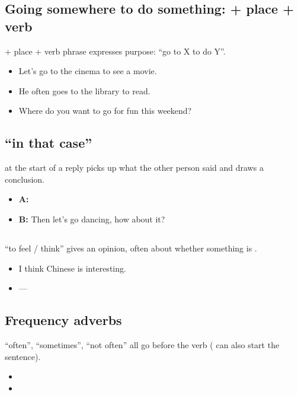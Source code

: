 \subsection{Going somewhere to do something:  + place + verb}

 + place + verb phrase expresses purpose: ``go to X to do Y''.
\begin{itemize}
  \item {} Let's go to the cinema to see a movie.
  \item {} He often goes to the library to read.
  \item {} Where do you want to go for fun this weekend?
\end{itemize}

\subsection{ ``in that case''}

 at the start of a reply picks up what the other person said and draws a
conclusion.
\begin{itemize}
  \item \textbf{A:} 
  \item \textbf{B:}  Then let's go dancing, how about it?
\end{itemize}

\subsection{}

 ``to feel / think'' gives an opinion, often about whether something is
.
\begin{itemize}
  \item {} I think Chinese is interesting.
  \item {}---
\end{itemize}

\subsection{Frequency adverbs}

 ``often'',  ``sometimes'',  ``not often'' all go before
the verb ( can also start the sentence).
\begin{itemize}
  \item {}
  \item {}
\end{itemize}

